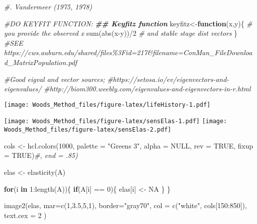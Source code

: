 \documentclass[
]{article}
\newenvironment{Shaded}{\begin{snugshade}}{\end{snugshade}}
\newcommand{\AttributeTok}[1]{\textcolor[rgb]{0.77,0.63,0.00}{#1}}
\newcommand{\CommentTok}[1]{\textcolor[rgb]{0.56,0.35,0.01}{\textit{#1}}}
\newcommand{\ConstantTok}[1]{\textcolor[rgb]{0.00,0.00,0.00}{#1}}
\newcommand{\ControlFlowTok}[1]{\textcolor[rgb]{0.13,0.29,0.53}{\textbf{#1}}}
\newcommand{\DecValTok}[1]{\textcolor[rgb]{0.00,0.00,0.81}{#1}}
\newcommand{\DocumentationTok}[1]{\textcolor[rgb]{0.56,0.35,0.01}{\textbf{\textit{#1}}}}
\newcommand{\FloatTok}[1]{\textcolor[rgb]{0.00,0.00,0.81}{#1}}
\newcommand{\FunctionTok}[1]{\textcolor[rgb]{0.00,0.00,0.00}{#1}}
\newcommand{\NormalTok}[1]{#1}
\newcommand{\OtherTok}[1]{\textcolor[rgb]{0.56,0.35,0.01}{#1}}
\newcommand{\SpecialCharTok}[1]{\textcolor[rgb]{0.00,0.00,0.00}{#1}}
\newcommand{\StringTok}[1]{\textcolor[rgb]{0.31,0.60,0.02}{#1}}
\begin{document}
\begin{Shaded}
\begin{Highlighting}[]
\CommentTok{\#. Vandermeer (1975, 1978)}

\CommentTok{\#DO KEYFIT FUNCTION:}
\DocumentationTok{\#\# Keyfitz function}
\NormalTok{keyfitz}\OtherTok{\textless{}{-}}\ControlFlowTok{function}\NormalTok{(x,y)\{ }\CommentTok{\# you provide the observed x}
\FunctionTok{sum}\NormalTok{(}\FunctionTok{abs}\NormalTok{(x}\SpecialCharTok{{-}}\NormalTok{y))}\SpecialCharTok{/}\DecValTok{2} \CommentTok{\# and stable stage dist vectors}
\NormalTok{\} }
\CommentTok{\#SEE https://cws.auburn.edu/shared/files\%3Fid=217\&filename=ConMan\_FileDownload\_MatrixPopulation.pdf}

\CommentTok{\#Good eigval and vector sources;}
\CommentTok{\#https://setosa.io/ev/eigenvectors{-}and{-}eigenvalues/}
\CommentTok{\#http://biom300.weebly.com/eigenvalues{-}and{-}eigenvectors{-}in{-}r.html}
\end{Highlighting}
\end{Shaded}

\texttt{[image: Woods\_Method\_files/figure-latex/lifeHistory-1.pdf]}

\texttt{[image: Woods\_Method\_files/figure-latex/sensElas-1.pdf]}
\texttt{[image: Woods\_Method\_files/figure-latex/sensElas-2.pdf]}

\begin{Shaded}
\begin{Highlighting}[]
\NormalTok{cols }\OtherTok{\textless{}{-}} \FunctionTok{hcl.colors}\NormalTok{(}\DecValTok{1000}\NormalTok{, }\AttributeTok{palette =} \StringTok{"Greens 3"}\NormalTok{, }\AttributeTok{alpha =} \ConstantTok{NULL}\NormalTok{, }\AttributeTok{rev =} \ConstantTok{TRUE}\NormalTok{, }\AttributeTok{fixup =} \ConstantTok{TRUE}\NormalTok{)}\CommentTok{\#, end = .85)}

\NormalTok{elas }\OtherTok{\textless{}{-}} \FunctionTok{elasticity}\NormalTok{(A)}

\ControlFlowTok{for}\NormalTok{(i }\ControlFlowTok{in} \DecValTok{1}\SpecialCharTok{:}\FunctionTok{length}\NormalTok{(A))\{}
  \ControlFlowTok{if}\NormalTok{(A[i] }\SpecialCharTok{==} \DecValTok{0}\NormalTok{)\{}
\NormalTok{    elas[i] }\OtherTok{\textless{}{-}}  \ConstantTok{NA}
\NormalTok{  \}}
\NormalTok{\}}

\FunctionTok{image2}\NormalTok{(elas, }\AttributeTok{mar=}\FunctionTok{c}\NormalTok{(}\DecValTok{1}\NormalTok{,}\FloatTok{3.5}\NormalTok{,}\DecValTok{5}\NormalTok{,}\DecValTok{1}\NormalTok{), }\AttributeTok{border=}\StringTok{"gray70"}\NormalTok{, }\AttributeTok{col =} \FunctionTok{c}\NormalTok{(}\StringTok{"white"}\NormalTok{, cols[}\DecValTok{150}\SpecialCharTok{:}\DecValTok{850}\NormalTok{]), }\AttributeTok{text.cex =} \DecValTok{2}\NormalTok{ )}
\end{Highlighting}
\end{Shaded}
\end{document}
